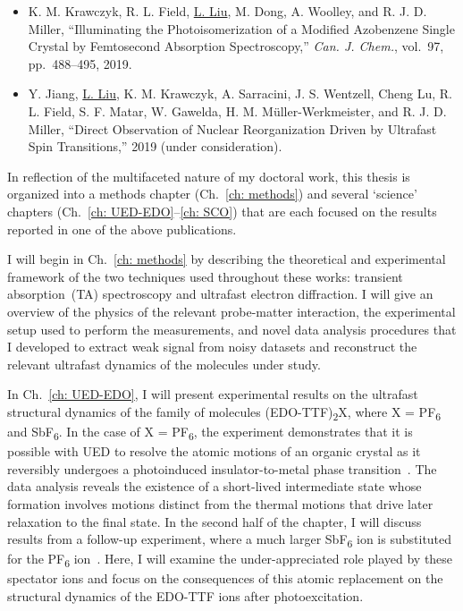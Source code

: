 \begin{itemize}
  \item K. M. Krawczyk, R. L. Field, \underline{L. Liu}, M. Dong, A. Woolley, and R. J. D. Miller,
    ``Illuminating the Photoisomerization of a Modified Azobenzene Single Crystal
      by Femtosecond Absorption Spectroscopy,'' \textit{Can. J. Chem.}, vol.~97, pp.~488--495, 2019.

  \item Y. Jiang, \underline{L. Liu}, K. M. Krawczyk, A. Sarracini, J. S. Wentzell, Cheng Lu,
    R. L. Field, S. F. Matar, W. Gawelda, H. M. M\"{u}ller-Werkmeister, and R. J. D. Miller,
    ``Direct Observation of Nuclear Reorganization Driven by Ultrafast Spin Transitions,''
    2019 (under consideration).

\end{itemize}

In reflection of the multifaceted nature of my doctoral work,
this thesis is organized into a methods chapter (Ch.~\ref{ch: methods})
and several `science' chapters (Ch.~\ref{ch: UED-EDO}--\ref{ch: SCO})
that are each focused on the results reported in one of the above publications.

I will begin in Ch.~\ref{ch: methods} by describing the theoretical and experimental framework
of the two techniques used throughout these works:
transient absorption~(TA) spectroscopy and ultrafast electron diffraction.
I will give an overview of the physics of the relevant probe-matter interaction,
the experimental setup used to perform the measurements, and novel data analysis procedures that
I developed to extract weak signal from noisy datasets and reconstruct the relevant ultrafast dynamics
of the molecules under study.

In Ch.~\ref{ch: UED-EDO}, I will present experimental results on the ultrafast structural dynamics
of the family of molecules (EDO-TTF)\textsubscript{2}X, where X = PF\textsubscript{6}
and SbF\textsubscript{6}.
In the case of X = PF\textsubscript{6}, the experiment demonstrates that it is possible with UED to
resolve the atomic motions of an organic crystal as it reversibly undergoes
a photoinduced insulator-to-metal phase transition~\cite{Gao2013}.
The data analysis reveals the existence of a short-lived intermediate state whose formation involves
motions distinct from the thermal motions that drive later relaxation to the final state.
In the second half of the chapter, I will discuss results from a follow-up experiment,
where a much larger SbF\textsubscript{6} ion is substituted
for the PF\textsubscript{6} ion~\cite{Liu2017}. Here, I will examine the under-appreciated role
played by these spectator ions and focus on the consequences of this atomic replacement
on the structural dynamics of the EDO-TTF ions after photoexcitation.

